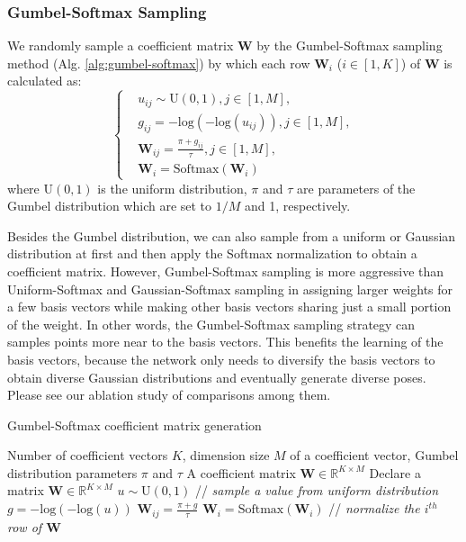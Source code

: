 \documentclass[sigconf,screen,nonacm]{acmart}
\begin{document}
	\subsubsection{Gumbel-Softmax Sampling}
	We randomly sample a coefficient matrix $\mathbf{W}$ by the Gumbel-Softmax sampling method (Alg. \ref{alg:gumbel-softmax}) by which each row $\mathbf{W}_i$ ($i\in [1,K]$) of $\mathbf{W}$ is calculated as:
	\begin{equation}
		\left\{
		\begin{aligned}
			&u_{ij} \sim \mathrm{U}(0, 1), j \in [1, M],\\
			&g_{ij} = -\mathrm{log}(-\mathrm{log}(u_{ij})), j \in [1, M],\\
			&\mathbf{W}_{ij} = \frac{\pi + g_{ij}}{\tau}, j \in [1, M],\\
			&\mathbf{W}_i = \mathrm{Softmax}(\mathbf{W}_i)
		\end{aligned}
		\right. \label{eq:gumbel}
	\end{equation} 
	where $\mathrm{U}(0, 1)$ is the uniform distribution, $\pi$ and $\tau$ are parameters of the Gumbel distribution which are set to $1/M$ and 1, respectively. 

	
	
	Besides the Gumbel distribution, we can also sample from a uniform or Gaussian distribution at first and then apply the Softmax normalization to obtain a coefficient matrix. However, Gumbel-Softmax sampling is more aggressive than Uniform-Softmax and Gaussian-Softmax sampling in assigning larger weights for a few basis vectors while making other basis vectors sharing just a small portion of the weight. In other words, the Gumbel-Softmax sampling strategy can samples points more near to the basis vectors. This benefits the learning of the basis vectors, because the network only needs to diversify the basis vectors to obtain diverse Gaussian distributions and eventually generate diverse poses. Please see our ablation study of comparisons among them.
	


	
	
	\begin{algorithm}[!t]
		\caption{Gumbel-Softmax coefficient matrix generation}\label{alg:gumbel-softmax}
		\begin{algorithmic}[1]
			\Require Number of coefficient vectors $K$, dimension size $M$ of a coefficient vector, Gumbel distribution parameters $\pi$ and $\tau$
			\Ensure A coefficient matrix $\mathbf{W} \in \mathbb{R}^{K\times M}$
			\State Declare a matrix $\mathbf{W} \in \mathbb{R}^{K\times M}$
			\State $u \sim \mathrm{U}(0, 1)$ // \textit{sample a value from uniform distribution}
			\State $g = -\mathrm{log}(-\mathrm{log}(u))$
			\State $\mathbf{W}_{ij} = \frac{\pi + g}{\tau}$
			\EndFor
			\State $\mathbf{W}_i = \mathrm{Softmax}(\mathbf{W}_i)$ // \textit{normalize the $i^{th}$ row of $\mathbf{W}$}
			\EndFor
		\end{algorithmic}
	\end{algorithm}
	
\end{document}
